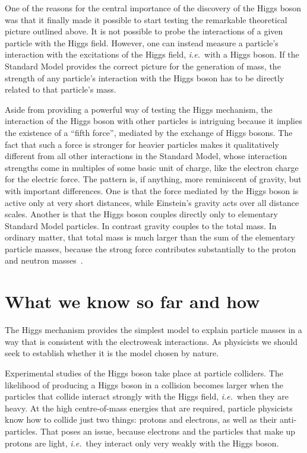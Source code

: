 \documentclass[12pt]{article}
\begin{document}
   
One of the reasons for the central importance of the discovery of the
Higgs boson was that it finally made it possible to
start testing the remarkable theoretical picture outlined above.
%
It is not possible to probe the interactions of a given particle
with the Higgs field. However, one can instead measure a particle's
interaction with the excitations of the Higgs field, {\it i.e.}\ with a
Higgs boson.
%
If the Standard Model provides the correct picture for the generation
of mass, the strength of any particle's interaction with the Higgs
boson has to be directly related to that particle's mass.

Aside from providing a powerful way of testing the Higgs mechanism,
the interaction of the Higgs boson with other particles is intriguing
because it implies the existence of a ``fifth force'', mediated by the
exchange of Higgs bosons. 
%
The fact that such a force is stronger for heavier particles makes it
qualitatively different from all other interactions in the Standard
Model, whose interaction strengths come in multiples of some basic
unit of charge, like the electron charge for the electric force.
%
The pattern is, if anything, more reminiscent of gravity, but with
important differences.
%
One is that the force mediated by the Higgs boson is
% 
active only at very short distances,
while Einstein's gravity 
acts over all distance scales.
%
Another is that the Higgs boson couples directly only to elementary
Standard Model particles.
%
In contrast gravity couples to the total mass.
%
In ordinary matter, that total mass is much larger than the sum of the
elementary particle masses, because the strong force contributes substantially to the proton and neutron masses~\cite{Durr:2008zz}.



\section{What we know so far and how}

The Higgs mechanism provides the simplest model to explain particle
masses in a way that is consistent with the electroweak interactions.
%
As physicists we should seek to establish whether it is the model
chosen by nature.

Experimental studies of the Higgs boson take place at particle
colliders.
%
The likelihood of producing a Higgs boson in a collision becomes larger
when the particles that collide interact strongly with the Higgs
field, {\it i.e.}\ when they are heavy.
%
At the high centre-of-mass energies that are required, particle
physicists know how to collide just two things: protons and electrons,
as well as their anti-particles.
%
That poses an issue, because electrons and the particles that make up
protons are light, {\it i.e.}\ they interact only very weakly with the Higgs
boson.
\end{document}
